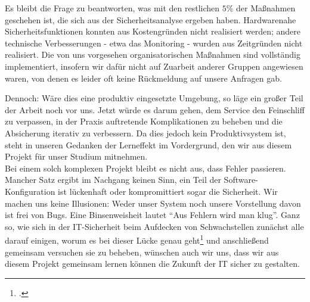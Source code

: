 Es bleibt die Frage zu beantworten, was mit den restlichen $5\%$ der Maßnahmen geschehen ist, die sich aus der Sicherheitsanalyse ergeben haben. Hardwarenahe Sicherheitsfunktionen konnten aus Kostengründen nicht realisiert werden; andere technische Verbesserungen - etwa das Monitoring - wurden aus Zeitgründen nicht realisiert. Die von uns vorgesehen organisatorischen Maßnahmen sind vollständig implementiert, insofern wir dafür nicht auf Zuarbeit anderer Gruppen angewiesen waren, von denen es leider oft keine Rückmeldung auf unsere Anfragen gab.

Dennoch: Wäre dies eine produktiv eingesetzte Umgebung, so läge ein großer Teil der Arbeit noch vor uns. Jetzt würde es darum gehen, dem Service den Feinschliff zu verpassen, in der Praxis auftretende Komplikationen zu beheben und die Absicherung iterativ zu verbessern. Da dies jedoch kein Produktivsystem ist, steht in unseren Gedanken der Lerneffekt im Vordergrund, den wir aus diesem Projekt für unser Studium mitnehmen. \\

Bei einem solch komplexen Projekt bleibt es nicht aus, dass Fehler passieren. Mancher Satz ergibt im Nachgang keinen Sinn, ein Teil der Software-Konfiguration ist lückenhaft oder kompromittiert sogar die Sicherheit. Wir machen uns keine Illusionen: Weder unser System noch unsere Vorstellung davon ist frei von Bugs. Eine Binsenweisheit lautet "`Aus Fehlern wird man klug"'. Ganz so, wie sich in der IT-Sicherheit beim Aufdecken von Schwachstellen zunächst alle darauf einigen, worum es bei dieser Lücke genau geht\footcite{wikiCVE} und anschließend gemeinsam versuchen sie zu beheben, wünschen auch wir uns, dass wir aus diesem Projekt gemeinsam lernen können die Zukunft der IT sicher zu gestalten.


\newpage

